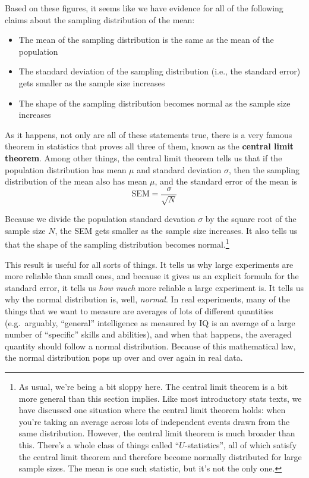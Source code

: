 \documentclass[
  11pt,
  a4paper,
  twoside,symmetric,openright]{book}
\providecommand{\tightlist}{%
  \setlength{\itemsep}{0pt}\setlength{\parskip}{0pt}}
\theoremstyle{break}
\theoremstyle{break}
\begin{document}
Based on these figures, it seems like we have evidence for all of the following claims about the sampling distribution of the mean:

\begin{itemize}
\tightlist
\item
  The mean of the sampling distribution is the same as the mean of the population
\item
  The standard deviation of the sampling distribution (i.e., the standard error) gets smaller as the sample size increases
\item
  The shape of the sampling distribution becomes normal as the sample size increases
\end{itemize}

As it happens, not only are all of these statements true, there is a very famous theorem in statistics that proves all three of them, known as the \textbf{central limit theorem}. Among other things, the central limit theorem tells us that if the population distribution has mean \(\mu\) and standard deviation \(\sigma\), then the sampling distribution of the mean also has mean \(\mu\), and the standard error of the mean is
\[
\mbox{SEM} = \frac{\sigma}{ \sqrt{N} }
\]

Because we divide the population standard devation \(\sigma\) by the square root of the sample size \(N\), the SEM gets smaller as the sample size increases. It also tells us that the shape of the sampling distribution becomes normal.\footnote{As usual, we're being a bit sloppy here. The central limit theorem is a bit more general than this section implies. Like most introductory stats texts, we have discussed one situation where the central limit theorem holds: when you're taking an average across lots of independent events drawn from the same distribution. However, the central limit theorem is much broader than this. There's a whole class of things called ``\(U\)-statistics'', all of which satisfy the central limit theorem and therefore become normally distributed for large sample sizes. The mean is one such statistic, but it's not the only one.}

This result is useful for all sorts of things. It tells us why large experiments are more reliable than small ones, and because it gives us an explicit formula for the standard error, it tells us \emph{how much} more reliable a large experiment is. It tells us why the normal distribution is, well, \emph{normal}. In real experiments, many of the things that we want to measure are averages of lots of different quantities (e.g.~arguably, ``general'' intelligence as measured by IQ is an average of a large number of ``specific'' skills and abilities), and when that happens, the averaged quantity should follow a normal distribution. Because of this mathematical law, the normal distribution pops up over and over again in real data.
\end{document}
